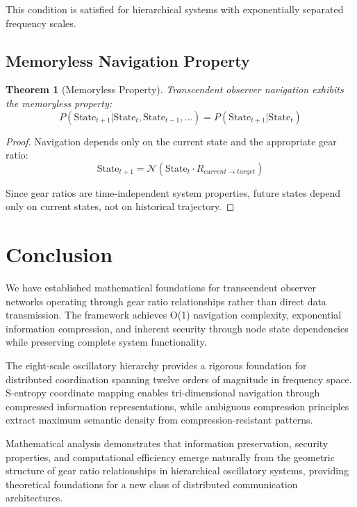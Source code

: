 \documentclass[12pt,a4paper]{article}
\newtheorem{theorem}{Theorem}
\begin{document}
This condition is satisfied for hierarchical systems with exponentially separated frequency scales.

\subsection{Memoryless Navigation Property}

\begin{theorem}[Memoryless Property]
Transcendent observer navigation exhibits the memoryless property:
\begin{equation}
P(\text{State}_{t+1} | \text{State}_t, \text{State}_{t-1}, \ldots) = P(\text{State}_{t+1} | \text{State}_t)
\end{equation}
\end{theorem}

\begin{proof}
Navigation depends only on the current state and the appropriate gear ratio:
\begin{equation}
\text{State}_{t+1} = \mathcal{N}(\text{State}_t \cdot R_{current \to target})
\end{equation}

Since gear ratios are time-independent system properties, future states depend only on current states, not on historical trajectory.
\end{proof}

\section{Conclusion}

We have established mathematical foundations for transcendent observer networks operating through gear ratio relationships rather than direct data transmission. The framework achieves O(1) navigation complexity, exponential information compression, and inherent security through node state dependencies while preserving complete system functionality.

The eight-scale oscillatory hierarchy provides a rigorous foundation for distributed coordination spanning twelve orders of magnitude in frequency space. S-entropy coordinate mapping enables tri-dimensional navigation through compressed information representations, while ambiguous compression principles extract maximum semantic density from compression-resistant patterns.

Mathematical analysis demonstrates that information preservation, security properties, and computational efficiency emerge naturally from the geometric structure of gear ratio relationships in hierarchical oscillatory systems, providing theoretical foundations for a new class of distributed communication architectures.
\end{document}
